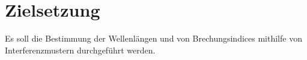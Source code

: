 
\section{Zielsetzung}
\label{sec:Zielsetzung}
Es soll die Bestimmung der Wellenlängen und von Brechungsindices mithilfe von Interferenzmustern durchgeführt werden.
